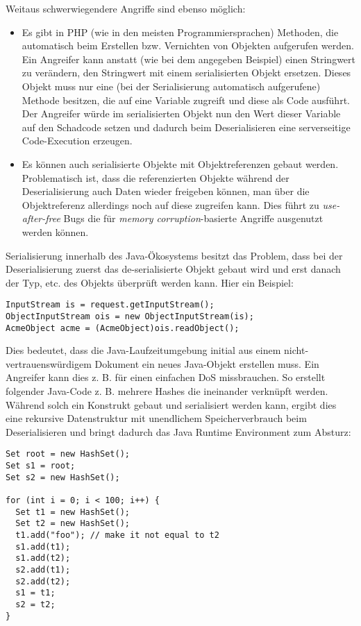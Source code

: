 Weitaus schwerwiegendere Angriffe sind ebenso möglich:

\begin{itemize}
	\item Es gibt in PHP (wie in den meisten Programmiersprachen) Methoden, die automatisch beim Erstellen bzw. Vernichten von Objekten aufgerufen werden. Ein Angreifer kann anstatt (wie bei dem angegeben Beispiel) einen Stringwert zu verändern, den Stringwert mit einem serialisierten Objekt ersetzen. Dieses Objekt muss nur eine (bei der Serialisierung automatisch aufgerufene) Methode besitzen, die auf eine Variable zugreift und diese als Code ausführt. Der Angreifer würde im serialisierten Objekt nun den Wert dieser Variable auf den Schadcode setzen und dadurch beim Deserialisieren eine serverseitige Code-Execution erzeugen.
	\item Es können auch serialisierte Objekte mit Objektreferenzen gebaut werden. Problematisch ist, dass die referenzierten Objekte während der Deserialisierung auch Daten wieder freigeben können, man über die Objektreferenz allerdings noch auf diese zugreifen kann. Dies führt zu \textit{use-after-free} Bugs die für \textit{memory corruption}-basierte Angriffe ausgenutzt werden können.
\end{itemize}

Serialisierung innerhalb des Java-Ökosystems besitzt das Problem, dass bei der Deserialisierung zuerst das de-serialisierte Objekt gebaut wird und erst danach der Typ, etc. des Objekts überprüft werden kann. Hier ein Beispiel:

\begin{verbatim}
InputStream is = request.getInputStream();
ObjectInputStream ois = new ObjectInputStream(is);
AcmeObject acme = (AcmeObject)ois.readObject();
\end{verbatim}

Dies bedeutet, dass die Java-Laufzeitumgebung initial aus einem nicht-vertrauenswürdigem Dokument ein neues Java-Objekt erstellen muss. Ein Angreifer kann dies z. B. für einen einfachen DoS missbrauchen. So erstellt folgender Java-Code z. B. mehrere Hashes die ineinander verknüpft werden. Während solch ein Konstrukt gebaut und serialisiert werden kann, ergibt dies eine rekursive Datenstruktur mit unendlichem Speicherverbrauch beim Deserialisieren und bringt dadurch das Java Runtime Environment zum Absturz:

\begin{verbatim}
Set root = new HashSet();
Set s1 = root;
Set s2 = new HashSet();

for (int i = 0; i < 100; i++) {
  Set t1 = new HashSet();
  Set t2 = new HashSet();
  t1.add("foo"); // make it not equal to t2
  s1.add(t1);
  s1.add(t2);
  s2.add(t1);
  s2.add(t2);
  s1 = t1;
  s2 = t2;
}
\end{verbatim}

